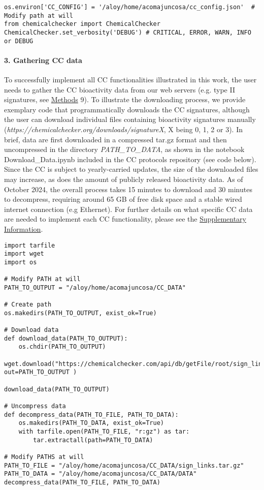 \begin{lstlisting}
os.environ['CC_CONFIG'] = '/aloy/home/acomajuncosa/cc_config.json'  # Modify path at will
from chemicalchecker import ChemicalChecker
ChemicalChecker.set_verbosity('DEBUG') # CRITICAL, ERROR, WARN, INFO or DEBUG
\end{lstlisting}

\paragraph{3. Gathering CC data} \leavevmode

To successfully implement all CC functionalities illustrated in this work, the user needs to gather the CC bioactivity data from our web servers (e.g. type II signatures, see \hyperref[Protocols_Methods]{Methods} 9). To illustrate the downloading process, we provide exemplary code that programmatically downloads the CC signatures, although the user can download individual files containing bioactivity signatures manually (\textit{https://chemicalchecker.org/downloads/signatureX}, X being 0, 1, 2 or 3). In brief, data are first downloaded in a compressed tar.gz format and then uncompressed in the directory \textit{PATH\_TO\_DATA}, as shown in the notebook Download\_Data.ipynb included in the CC protocols repository (see code below). Since the CC is subject to yearly-carried updates, the size of the downloaded files may increase, as does the amount of publicly released bioactivity data. As of October 2024, the overall process takes 15 minutes to download and 30 minutes to decompress, requiring around 65 GB of free disk space and a stable wired internet connection (e.g Ethernet). For further details on what specific CC data are needed to implement each CC functionality, please see the \hyperref[Supplementary_Protocols_DownloadingData]{Supplementary Information}.  \\

\begin{lstlisting}
import tarfile
import wget
import os

# Modify PATH at will
PATH_TO_OUTPUT = "/aloy/home/acomajuncosa/CC_DATA"

# Create path
os.makedirs(PATH_TO_OUTPUT, exist_ok=True)

# Download data
def download_data(PATH_TO_OUTPUT):
    os.chdir(PATH_TO_OUTPUT)
    wget.download("https://chemicalchecker.com/api/db/getFile/root/sign_links.tar.gz/", out=PATH_TO_OUTPUT )

download_data(PATH_TO_OUTPUT)

# Uncompress data
def decompress_data(PATH_TO_FILE, PATH_TO_DATA):
    os.makedirs(PATH_TO_DATA, exist_ok=True)
    with tarfile.open(PATH_TO_FILE, "r:gz") as tar:
        tar.extractall(path=PATH_TO_DATA)

# Modify PATHS at will
PATH_TO_FILE = "/aloy/home/acomajuncosa/CC_DATA/sign_links.tar.gz"
PATH_TO_DATA = "/aloy/home/acomajuncosa/CC_DATA/DATA"
decompress_data(PATH_TO_FILE, PATH_TO_DATA)
\end{lstlisting}

